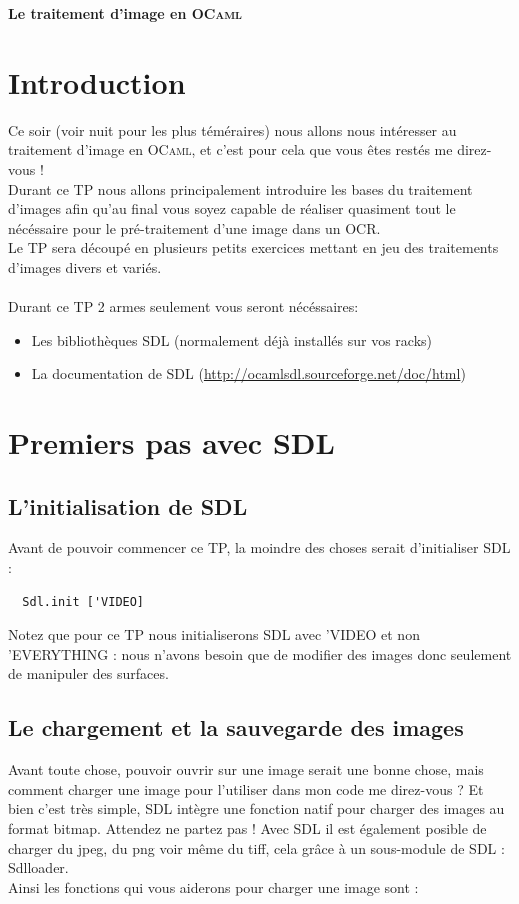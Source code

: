 \documentclass[a4paper]{article}
\begin{document}
\begin{center}
  {\Large {\bf Le traitement d'image en
  \textsc{OCaml}}}
\end{center}

\bigskip

\section*{Introduction}

Ce soir (voir nuit pour les plus téméraires) nous allons nous intéresser au traitement d'image en \textsc{OCaml}, et c'est pour cela que 
vous êtes restés me direz-vous !\\
Durant ce TP nous allons principalement introduire les
 bases du traitement d'images afin qu'au final vous soyez capable de réaliser quasiment tout le nécéssaire
 pour le pré-traitement d'une image dans un OCR.\\\smallskip
Le TP sera découpé en plusieurs petits exercices mettant en jeu des traitements d'images divers et variés.\\\\
Durant ce TP 2 armes seulement vous seront nécéssaires:
\begin{itemize}
\item Les bibliothèques SDL (normalement déjà installés sur vos racks)
\item La documentation de SDL (\url{http://ocamlsdl.sourceforge.net/doc/html})
\end{itemize}


\section{Premiers pas avec SDL}
\subsection{L'initialisation de SDL}
Avant de pouvoir commencer ce TP, la moindre des choses serait d'initialiser SDL :

\begin{verbatim}
  Sdl.init ['VIDEO]
\end{verbatim}

Notez que pour ce TP nous initialiserons SDL avec 'VIDEO et non 'EVERYTHING : nous n'avons besoin que de modifier des images donc seulement de manipuler des surfaces.


\subsection{Le chargement et la sauvegarde des images}
Avant toute chose, pouvoir ouvrir sur une image serait une bonne chose, mais comment charger une image pour l'utiliser dans mon code me direz-vous ?
Et bien c'est très simple, SDL intègre une fonction natif pour charger des images au format bitmap. Attendez ne partez pas ! Avec SDL il est également posible de charger du jpeg, du png voir même du tiff, cela grâce à un sous-module de SDL : Sdlloader.\\\smallskip
Ainsi les fonctions qui vous aiderons pour charger une image sont :
\end{document}
